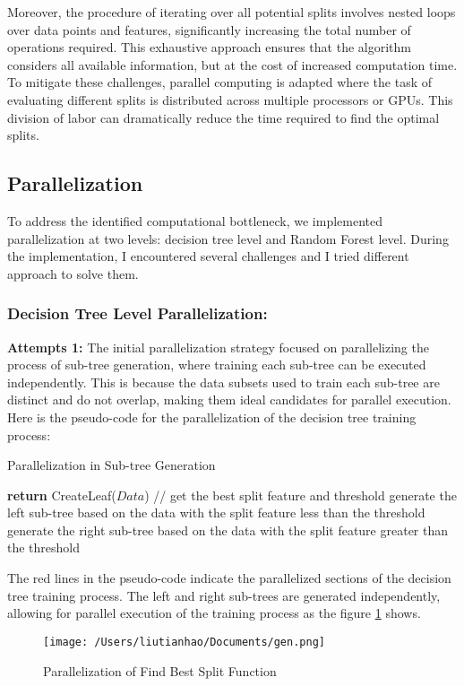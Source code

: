 \documentclass[13pt]{article}
\begin{document}
\newline
Moreover, the procedure of iterating over all potential splits involves nested loops over data points and features, significantly increasing the total number of operations required. This exhaustive approach ensures that the algorithm considers all available information, but at the cost of increased computation time. 
\newline
\newline
To mitigate these challenges, parallel computing is adapted where the task of evaluating different splits is distributed across multiple processors or GPUs. This division of labor can dramatically reduce the time required to find the optimal splits.



\subsection{Parallelization}
To address the identified computational bottleneck, we implemented parallelization at two levels: decision tree level and Random Forest level.
During the implementation, I encountered several challenges and I tried different approach to solve them.

\subsubsection{Decision Tree Level Parallelization:} 
    
\textbf{Attempts 1: }
The initial parallelization strategy focused on parallelizing the process of sub-tree generation, where training each sub-tree can be executed independently.
This is because the data subsets used to train each sub-tree are distinct and do not overlap, making them ideal candidates for parallel execution.
Here is the pseudo-code for the parallelization of the decision tree training process:
\begin{algorithm}
    \caption{Parallelization in Sub-tree Generation}\label{alg:gen}
    \begin{algorithmic}[1]
            \State \textbf{return} CreateLeaf($Data$)
        \EndIf
        \State // get the best split feature and threshold
        \State \color{red} generate the left sub-tree based on the data with the split feature less than the threshold \color{black}
        \State \color{red} generate the right sub-tree based on the data with the split feature greater than the threshold \color{black}
    \EndProcedure
    \end{algorithmic}
\end{algorithm}
The red lines in the pseudo-code indicate the parallelized sections of the decision tree training process. 
The left and right sub-trees are generated independently, allowing for parallel execution of the training process as the figure \ref{fig:gen} shows.
\begin{figure}[ht]
    \centering
    \texttt{[image: /Users/liutianhao/Documents/gen.png]}
    \caption{Parallelization of Find Best Split Function}
    \label{fig:gen}
\end{figure}
\end{document}
